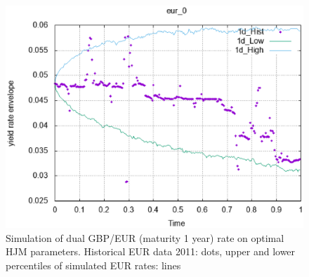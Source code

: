 \documentclass[10pt]{article}
\begin{document}
\begin{figure}[H]
\centering
\includegraphics [width=1\textwidth]{blank.eps}
\caption{Simulation of dual GBP/EUR (maturity 1 year) rate on optimal HJM parameters. Historical EUR data 2011: dots, upper and lower percentiles of simulated EUR rates: lines}
\label{eur2d}
\end{figure}
\end{document}
